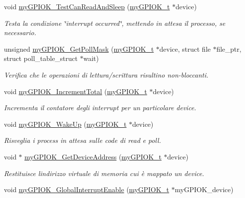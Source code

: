 \begin{DoxyCompactItemize}
void \hyperlink{group__my_g_p_i_o_k__t_gaf1b6f35c097c46361d675a42f122828e}{my\+G\+P\+I\+O\+K\+\_\+\+Test\+Can\+Read\+And\+Sleep} (\hyperlink{structmy_g_p_i_o_k__t}{my\+G\+P\+I\+O\+K\+\_\+t} $\ast$device)
\begin{DoxyCompactList}\small\item\em Testa la condizione \char`\"{}interrupt occurred\char`\"{}, mettendo in attesa il processo, se necessario. \end{DoxyCompactList}\item 
unsigned \hyperlink{group__my_g_p_i_o_k__t_gae428f50a6da69e3cf89348b8ba9401b1}{my\+G\+P\+I\+O\+K\+\_\+\+Get\+Poll\+Mask} (\hyperlink{structmy_g_p_i_o_k__t}{my\+G\+P\+I\+O\+K\+\_\+t} $\ast$device, struct file $\ast$file\+\_\+ptr, struct poll\+\_\+table\+\_\+struct $\ast$wait)
\begin{DoxyCompactList}\small\item\em Verifica che le operazioni di lettura/scrittura risultino non-\/bloccanti. \end{DoxyCompactList}\item 
void \hyperlink{group__my_g_p_i_o_k__t_ga5a7df448de9de94620ce1baf7ec388c9}{my\+G\+P\+I\+O\+K\+\_\+\+Increment\+Total} (\hyperlink{structmy_g_p_i_o_k__t}{my\+G\+P\+I\+O\+K\+\_\+t} $\ast$device)
\begin{DoxyCompactList}\small\item\em Incrementa il contatore degli interrupt per un particolare device. \end{DoxyCompactList}\item 
void \hyperlink{group__my_g_p_i_o_k__t_gae182aa943af08c102a05795ae8526192}{my\+G\+P\+I\+O\+K\+\_\+\+Wake\+Up} (\hyperlink{structmy_g_p_i_o_k__t}{my\+G\+P\+I\+O\+K\+\_\+t} $\ast$device)
\begin{DoxyCompactList}\small\item\em Risveglia i process in attesa sulle code di read e poll. \end{DoxyCompactList}\item 
void $\ast$ \hyperlink{group__my_g_p_i_o_k__t_ga565ffd4946b330b29e1166dfc9851b11}{my\+G\+P\+I\+O\+K\+\_\+\+Get\+Device\+Address} (\hyperlink{structmy_g_p_i_o_k__t}{my\+G\+P\+I\+O\+K\+\_\+t} $\ast$device)
\begin{DoxyCompactList}\small\item\em Restituisce l\textquotesingle{}indirizzo virtuale di memoria cui è mappato un device. \end{DoxyCompactList}\item 
void \hyperlink{group__my_g_p_i_o_k__t_ga00a24f28b49c71aaa91f66be71a3895b}{my\+G\+P\+I\+O\+K\+\_\+\+Global\+Interrupt\+Enable} (\hyperlink{structmy_g_p_i_o_k__t}{my\+G\+P\+I\+O\+K\+\_\+t} $\ast$my\+G\+P\+I\+O\+K\+\_\+device)

\end{DoxyCompactItemize}
